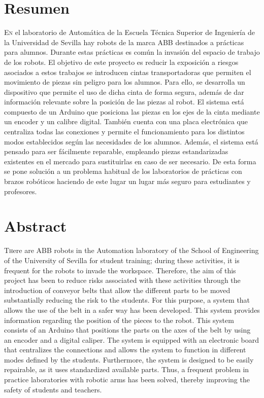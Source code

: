 \chapter*{Resumen}
\pagestyle{especial}
{}

\lettrine[lraise=-0.1, lines=2, loversize=0.2]{E}n el laboratorio de Automática
de la Escuela Técnica Superior de Ingeniería de la Universidad de Sevilla 
hay robots de la marca ABB destinados a prácticas para alumnos. Durante estas 
prácticas es común la invasión del espacio de trabajo de los robots. El objetivo de
este proyecto es reducir 
la exposición a riesgos asociados a estos trabajos se introducen cintas transportadoras
que permiten el movimiento de piezas sin peligro para los alumnos. Para ello,
se desarrolla un dispositivo que permite el uso de dicha cinta de forma segura, 
además de dar información relevante sobre la posición de las piezas al robot.
El sistema está compuesto de un Arduino que posiciona las piezas en los ejes de la cinta
mediante un encoder y un calibre digital. También cuenta con una placa electrónica que
centraliza todas las conexiones y permite el funcionamiento para los distintos modos establecidos
según las necesidades de los alumnos.
Además, el sistema está pensado para ser fácilmente reparable, empleando piezas 
estandarizadas existentes en el mercado para sustituirlas en caso de ser necesario.
De esta forma se pone solución a un problema habitual de los laboratorios de prácticas con brazos
robóticos haciendo de este lugar un lugar más seguro para estudiantes y profesores.


\chapter*{Abstract}
\pagestyle{especial}
{}

\lettrine[lraise=-0.1, lines=2, loversize=0.2]{T}here are ABB robots in the Automation laboratory of 
the School of Engineering of the University of Sevilla for student training; during these activities, 
it is frequent for the robots to invade the workspace. 
Therefore, the aim of this project has been to reduce risks associated with these activities through the 
introduction of conveyor belts that allow the different parts to be moved 
substantially reducing the risk to the students. For this purpose, a system that allows the use of the belt 
in a safer way has been developed. This system provides information regarding the position of the 
pieces to the robot. This system consists of an Arduino that positions the parts on the 
axes of the belt by using an encoder and a digital caliper. The system is 
equipped with an electronic board that centralizes the connections and allows the system to function in 
different modes defined by the students. Furthermore, the system is designed to be easily repairable, as 
it uses standardized available parts. Thus, a frequent problem in practice laboratories with robotic arms 
has been solved, thereby improving the safety of students and teachers.